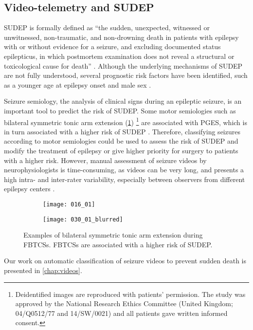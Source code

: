 \subsection{Video-telemetry and SUDEP}

\ac{SUDEP} is formally defined as ``the sudden, unexpected, witnessed or unwitnessed, non-traumatic, and non-drowning death in patients with epilepsy with or without evidence for a seizure, and excluding documented status epilepticus, in which postmortem examination does not reveal a structural or toxicological cause for death'' \cite{nashef_sudden_1997}.
Although the underlying mechanisms of \ac{SUDEP} are not fully understood, several prognostic risk factors have been identified, such as a younger age at epilepsy onset and male sex \cite{so_what_2008,jha_sudden_2021}.

Seizure semiology, the analysis of clinical signs during an epileptic seizure, is an important tool to predict the risk of \ac{SUDEP}.
Some motor semiologies such as bilateral symmetric tonic arm extension (\cref{fig:decerebration})%
\footnote{Deidentified images are reproduced with patients' permission. The study was approved by the National Research Ethics Committee (United Kingdom; 04/Q0512/77 and 14/SW/0021) and all patients gave written informed consent.} %
are associated with \ac{PGES}, which is in turn associated with a higher risk of \ac{SUDEP} \cite{alexandre_risk_2015,vilella_association_2021}.
Therefore, classifying seizures according to motor semiologies could be used to assess the risk of \ac{SUDEP} and modify the treatment of epilepsy or give higher priority for surgery to patients with a higher risk.
However, manual assessment of seizure videos by neurophysiologists is time-consuming, as videos can be very long, and presents a high intra- and inter-rater variability, especially between observers from different epilepsy centers \cite{tufenkjian_seizure_2012}.

\begin{figure}
  \centering

  \begin{subfigure}{0.49\linewidth}
    \texttt{[image: 016\_01]}
  \end{subfigure}
  \begin{subfigure}{0.49\linewidth}
    \texttt{[image: 030\_01\_blurred]}
  \end{subfigure}
  \caption[Examples of bilateral symmetric tonic arm extension]{
    Examples of bilateral symmetric tonic arm extension during \acfp{FBTCS}.
    \Acp{FBTCS} are associated with a higher risk of \acf{SUDEP}.
  }
  \label{fig:decerebration}
\end{figure}

Our work on automatic classification of seizure videos to prevent sudden death is presented in \cref{chap:videos}.
